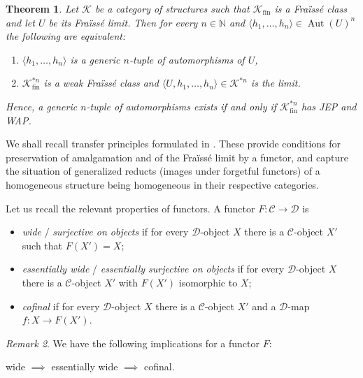 \documentclass[oneside,notitlepage,12pt]{article}
\newtheorem{tw}{Theorem}[section]
\theoremstyle{definition}
\theoremstyle{remark}
\newtheorem{uwgi}[tw]{Remark}
\newcommand \seq [1]{\langle #1 \rangle}
\newcommand \maps {\colon} %
\newcommand \N {\mathbb{N}}
\newcommand \C {\mathscr{C}}
\newcommand \D {\mathscr{D}}
\newcommand \K {\mathscr{K}}
\newcommand \fin {{\operatorname{fin}}}
\newcommand \Aut {\operatorname{Aut}}
\begin{document}
\begin{tw} \label{thm:KR}
    Let $\K$  be a category of structures such that $\K_\fin$ is a Fraïssé class and let $U$ be its Fraïssé limit.
    Then for every $n \in \N$ and $\seq{h_1, \ldots, h_n} \in \Aut(U)^n$ the following are equivalent:
    \begin{enumerate}
        \item $\seq{h_1, \ldots, h_n}$ is a generic $n$-tuple of automorphisms of $U$,
        \item $\K_\fin^{*n}$ is a weak Fraïssé class and $\seq{U, h_1, \ldots, h_n} \in \K^{*n}$ is the limit.
    \end{enumerate}
    Hence, a generic $n$-tuple of automorphisms exists if and only if $\K_\fin^{*n}$ has JEP and WAP.
\end{tw}






We shall recall transfer principles formulated in \cite[Section~3.1]{paper1}.
These provide conditions for preservation of amalgamation and of the Fraïssé limit by a functor, and capture the situation of generalized reducts (images under forgetful functors) of a homogeneous structure being homogeneous in their respective categories.

Let us recall the relevant properties of functors.
A functor $F\maps \C \to \D$ is


\begin{itemize}
    \item {\it wide} / {\it surjective on objects} if for every $\D$-object $X$ there is a $\C$-object $X'$ such that $F(X')=X$;
    
    \item {\it essentially wide} / {\it essentially surjective on objects} if for every $\D$-object $X$ there is a $\C$-object $X'$ with $F(X') $ isomorphic to $ X$;
    
	\item {\it cofinal} if for every $\D$-object $X$ there is a $\C$-object $X'$ and a $\D$-map $f\maps X \to F(X')$.
\end{itemize}

\begin{uwgi}
We have the following implications for a functor $F$:

\smallskip
\centerline{wide $\implies$ essentially wide $\implies$ cofinal.}
\end{uwgi}
\end{document}
